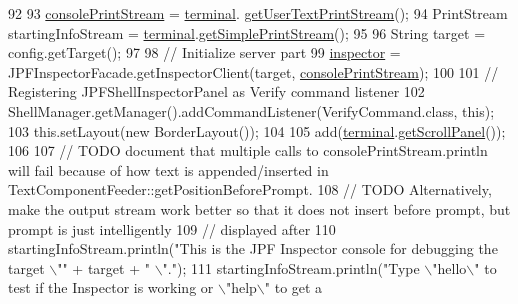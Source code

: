 \begin{DoxyCode}
92 
93     \hyperlink{classgov_1_1nasa_1_1jpf_1_1inspector_1_1frontends_1_1jpfshell_1_1_j_p_f_shell_inspector_panel_a736b2f57f5e00c303d0f39b95ea20881}{consolePrintStream} = \hyperlink{classgov_1_1nasa_1_1jpf_1_1inspector_1_1frontends_1_1jpfshell_1_1_j_p_f_shell_inspector_panel_a444a1b705fa48380375e7a920a140337}{terminal}.
      \hyperlink{classgov_1_1nasa_1_1jpf_1_1inspector_1_1frontends_1_1jpfshell_1_1gui_1_1_swing_terminal_a5cec7ed0d51341b8ff2c65090c7f7a14}{getUserTextPrintStream}();
94     PrintStream startingInfoStream = \hyperlink{classgov_1_1nasa_1_1jpf_1_1inspector_1_1frontends_1_1jpfshell_1_1_j_p_f_shell_inspector_panel_a444a1b705fa48380375e7a920a140337}{terminal}.\hyperlink{classgov_1_1nasa_1_1jpf_1_1inspector_1_1frontends_1_1jpfshell_1_1gui_1_1_swing_terminal_a2e5ba8df78cfa20c3ccaf3a9a833fbb0}{getSimplePrintStream}();
95 
96     String target = config.getTarget();
97 
98     \textcolor{comment}{// Initialize server part}
99     \hyperlink{classgov_1_1nasa_1_1jpf_1_1inspector_1_1frontends_1_1jpfshell_1_1_j_p_f_shell_inspector_panel_acecd6528a364612136bc7cf50bd89e69}{inspector} = JPFInspectorFacade.getInspectorClient(target, 
      \hyperlink{classgov_1_1nasa_1_1jpf_1_1inspector_1_1frontends_1_1jpfshell_1_1_j_p_f_shell_inspector_panel_a736b2f57f5e00c303d0f39b95ea20881}{consolePrintStream});
100 
101     \textcolor{comment}{// Registering JPFShellInspectorPanel as Verify command listener}
102     ShellManager.getManager().addCommandListener(VerifyCommand.class, \textcolor{keyword}{this});
103     this.setLayout(\textcolor{keyword}{new} BorderLayout());
104 
105     add(\hyperlink{classgov_1_1nasa_1_1jpf_1_1inspector_1_1frontends_1_1jpfshell_1_1_j_p_f_shell_inspector_panel_a444a1b705fa48380375e7a920a140337}{terminal}.\hyperlink{classgov_1_1nasa_1_1jpf_1_1inspector_1_1frontends_1_1jpfshell_1_1gui_1_1_swing_terminal_ae57441391d91dc792be3d6cc699877e5}{getScrollPanel}());
106 
107     \textcolor{comment}{// TODO document that multiple calls to consolePrintStream.println will fail because of how text is
       appended/inserted in TextComponentFeeder::getPositionBeforePrompt.}
108     \textcolor{comment}{// TODO Alternatively, make the output stream work better so that it does not insert before prompt, but
       prompt is just intelligently}
109     \textcolor{comment}{// displayed after}
110     startingInfoStream.println(\textcolor{stringliteral}{"This is the JPF Inspector console for debugging the target \(\backslash\)""} + target + \textcolor{stringliteral}{"
      \(\backslash\)"."});
111     startingInfoStream.println(\textcolor{stringliteral}{"Type \(\backslash\)"hello\(\backslash\)" to test if the Inspector is working or \(\backslash\)"help\(\backslash\)" to get a
}
\end{DoxyCode}

